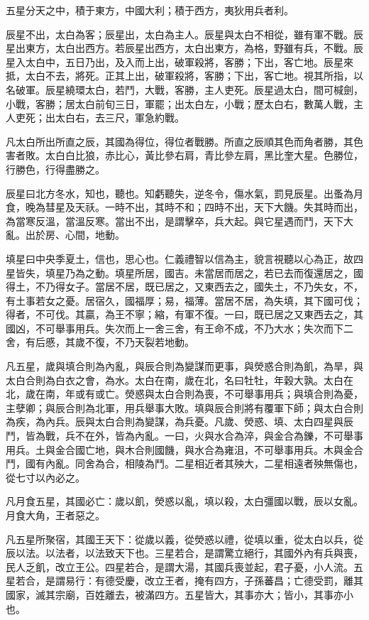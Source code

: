 \begin{pinyinscope}
五星分天之中，積于東方，中國大利；積于西方，夷狄用兵者利。

辰星不出，太白為客；辰星出，太白為主人。辰星與太白不相從，雖有軍不戰。辰星出東方，太白出西方。若辰星出西方，太白出東方，為格，野雖有兵，不戰。辰星入太白中，五日乃出，及入而上出，破軍殺將，客勝；下出，客亡地。辰星來抵，太白不去，將死。正其上出，破軍殺將，客勝；下出，客亡地。視其所指，以名破軍。辰星繞環太白，若鬥，大戰，客勝，主人吏死。辰星過太白，間可椷劍，小戰，客勝；居太白前旬三日，軍罷；出太白左，小戰；歷太白右，數萬人戰，主人吏死；出太白右，去三尺，軍急約戰。

凡太白所出所直之辰，其國為得位，得位者戰勝。所直之辰順其色而角者勝，其色害者敗。太白白比狼，赤比心，黃比參右肩，青比參左肩，黑比奎大星。色勝位，行勝色，行得盡勝之。

辰星曰北方冬水，知也，聽也。知虧聽失，逆冬令，傷水氣，罰見辰星。出蚤為月食，晚為彗星及天祅。一時不出，其時不和；四時不出，天下大饑。失其時而出，為當寒反溫，當溫反寒。當出不出，是謂擊卒，兵大起。與它星遇而鬥，天下大亂。出於房、心間，地動。

填星曰中央季夏土，信也，思心也。仁義禮智以信為主，貌言視聽以心為正，故四星皆失，填星乃為之動。填星所居，國吉。未當居而居之，若已去而復還居之，國得土，不乃得女子。當居不居，既已居之，又東西去之，國失土，不乃失女，不，有土事若女之憂。居宿久，國福厚；易，福薄。當居不居，為失填，其下國可伐；得者，不可伐。其贏，為王不寧；縮，有軍不復。一曰，既已居之又東西去之，其國凶，不可舉事用兵。失次而上一舍三舍，有王命不成，不乃大水；失次而下二舍，有后慼，其歲不復，不乃天裂若地動。

凡五星，歲與填合則為內亂，與辰合則為變謀而更事，與熒惑合則為飢，為旱，與太白合則為白衣之會，為水。太白在南，歲在北，名曰牡牡，年穀大孰。太白在北，歲在南，年或有或亡。熒惑與太白合則為喪，不可舉事用兵；與填合則為憂，主孽卿；與辰合則為北軍，用兵舉事大敗。填與辰合則將有覆軍下師；與太白合則為疾，為內兵。辰與太白合則為變謀，為兵憂。凡歲、熒惑、填、太白四星與辰鬥，皆為戰，兵不在外，皆為內亂。一曰，火與水合為淬，與金合為鑠，不可舉事用兵。土與金合國亡地，與木合則國饑，與水合為雍沮，不可舉事用兵。木與金合鬥，國有內亂。同舍為合，相陵為鬥。二星相近者其殃大，二星相遠者殃無傷也，從七寸以內必之。

凡月食五星，其國必亡：歲以飢，熒惑以亂，填以殺，太白彊國以戰，辰以女亂。月食大角，王者惡之。

凡五星所聚宿，其國王天下：從歲以義，從熒惑以禮，從填以重，從太白以兵，從辰以法。以法者，以法致天下也。三星若合，是謂驚立絕行，其國外內有兵與喪，民人乏飢，改立王公。四星若合，是謂大湯，其國兵喪並起，君子憂，小人流。五星若合，是謂易行：有德受慶，改立王者，掩有四方，子孫蕃昌；亡德受罰，離其國家，滅其宗廟，百姓離去，被滿四方。五星皆大，其事亦大；皆小，其事亦小也。


\end{pinyinscope}
